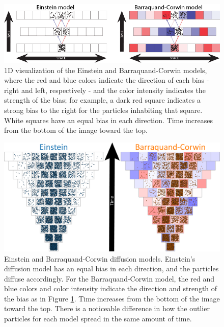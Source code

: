 \begin{figure}[hb]
\begin{center}
\includegraphics[width=0.9\columnwidth]{Figures/model_both_sidebyside.png}
\caption{\label{fig:1D_BC} 1D visualization of the Einstein and Barraquand-Corwin models, where the red and blue colors indicate the direction of each bias - right and left, respectively - and the color intensity indicates the strength of the bias; for example, a dark red square indicates a strong bias to the right for the particles inhabiting that square. White squares have an equal bias in each direction. Time increases from the bottom of the image toward the top.}
\end{center}
\end{figure}

\begin{figure}[ht]
\begin{center}
\includegraphics[width=0.9\columnwidth]{Figures/TriangleGrowth-01.png}
\caption{\label{fig:comparison} Einstein and Barraquand-Corwin diffusion models. Einstein's diffusion model has an equal bias in each direction, and the particles diffuse accordingly. For the Barraquand-Corwin model, the red and blue colors and color intensity indicate the direction and strength of the bias as in Figure \ref{fig:1D_BC}. Time increases from the bottom of the image toward the top. There is a noticeable difference in how the outlier particles for each model spread in the same amount of time.}
\end{center}
\end{figure}


